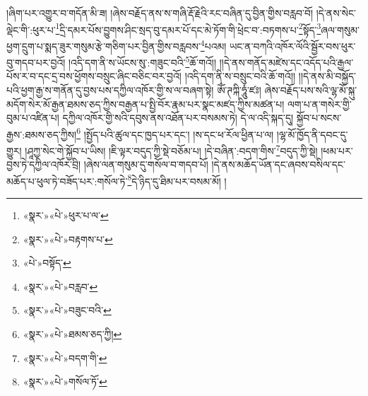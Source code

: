 །ཞིག་པར་འགྱུར་བ་གདོན་མི་ཟ། །ཞེས་བརྗོད་ནས་ས་གཞི་རྡོ་རྗེའི་རང་བཞིན་དུ་བྱིན་གྱིས་བརླབ་བོ། །དེ་ནས་སེང་ལྡེང་གི་:ཕུར་པ་\footnote{«སྣར་»«པེ་»ཕུར་པ་ལ་}དྲི་དམར་པོས་བྱུགས་ཤིང་སྲད་བུ་དམར་པོ་དང་མེ་ཏོག་གི་ཕྲེང་བ་:བཏགས་པ་\footnote{«སྣར་»«པེ་»བརྟགས་པ་}སྟོད་\footnote{«པེ་»བསྟོད་}ཞལ་གསུམ་ཕྱག་དྲུག་པ་སྨད་ཟུར་གསུམ་རྩེ་གཅིག་པར་བྱིན་གྱིས་བརླབས་\footnote{«སྣར་»«པེ་»བརླབ་}པའམ། ཡང་ན་བཀའི་འཁོར་ལོའི་སྦྱོར་བས་ཕུར་བུ་གདབ་པར་བྱའོ། །འདི་དག་ནི་ས་ཡོངས་སུ་:གཟུང་བའི་\footnote{«སྣར་»«པེ་»བཟུང་བའི་}ཆོ་གའོ།། །།དེ་ནས་གནོད་མཛེས་དང་འདོད་པའི་རྒྱལ་པོས་ར་བ་དང་དྲ་བས་ཕྱོགས་བསྲུང་ཞིང་བཅིང་བར་བྱའོ། །འདི་དག་ནི་ས་བསྲུང་བའི་ཆོ་གའོ།། །།དེ་ནས་མི་བསྐྱོད་པའི་ཕྱག་རྒྱ་ས་གནོན་དུ་བྱས་པས་དཀྱིལ་འཁོར་གྱི་ས་ལ་བཞག་སྟེ། ཨོཾ་ཊཀྐི་ཧཱུཾ་ཛཿ། ཞེས་བརྗོད་པས་སའི་ལྷ་མོ་སྐུ་མདོག་སེར་མོ་རྒྱན་ཐམས་ཅད་ཀྱིས་བརྒྱན་པ་སྤྱི་བོར་རྣམ་པར་སྣང་མཛད་ཀྱིས་མཚན་པ། ལག་པ་ན་གསེར་གྱི་བུམ་པ་འཛིན་པ། དཀྱིལ་འཁོར་གྱི་སའི་དབུས་ནས་འཐོན་པར་བསམས་ཏེ། དེ་ལ་འདི་སྐད་དུ། སྐྱོབ་པ་སངས་རྒྱས་:ཐམས་ཅད་ཀྱིས།\footnote{«སྣར་»«པེ་»ཐམས་ཅད་ཀྱི།} །སྤྱོད་པའི་ཚུལ་དང་ཁྱད་པར་དང་། །ས་དང་ཕ་རོལ་ཕྱིན་པ་ལ། །ལྷ་མོ་ཁྱོད་ནི་དབང་དུ་གྱུར། །ཤཱཀྱ་སེང་གེ་སྐྱོབ་པ་ཡིས། །ཇི་ལྟར་བདུད་ཀྱི་སྡེ་བཅོམ་པ། །དེ་བཞིན་:བདག་གིས་\footnote{«སྣར་»«པེ་»བདག་གི་}བདུད་ཀྱི་སྡེ། །ཕམ་པར་བྱས་ཏེ་དཀྱིལ་འཁོར་བྲི། །ཞེས་ལན་གསུམ་དུ་གསོལ་བ་གདབ་པོ། །དེ་ནས་མཆོད་ཡོན་དང་ཞབས་བསིལ་དང་མཆོད་པ་ཕུལ་ཏེ་བཟོད་པར་:གསོལ་ཏེ་\footnote{«སྣར་»«པེ་»གསོལ་ཏོ་}དེ་ཉིད་དུ་ཐིམ་པར་བསམ་མོ། །
